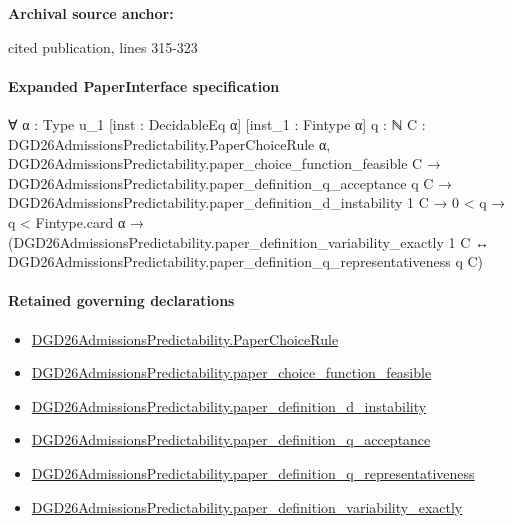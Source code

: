 \documentclass[10pt]{article}
\begin{document}
\textbf{Archival source anchor:} {\footnotesize\raggedright cited publication, lines 315-\allowbreak{}323\par}
\paragraph{Expanded PaperInterface specification}
\begin{ReviewVerbatim}
∀ {α : Type u_1} [inst : DecidableEq α] [inst_1 : Fintype α] {q : ℕ}
  {C : DGD26AdmissionsPredictability.PaperChoiceRule α},
  DGD26AdmissionsPredictability.paper_choice_function_feasible C →
    DGD26AdmissionsPredictability.paper_definition_q_acceptance q C →
      DGD26AdmissionsPredictability.paper_definition_d_instability 1 C →
        0 < q →
          q < Fintype.card α →
            (DGD26AdmissionsPredictability.paper_definition_variability_exactly 1 C ↔
              DGD26AdmissionsPredictability.paper_definition_q_representativeness q C)
\end{ReviewVerbatim}

\paragraph{Retained governing declarations}
\begin{itemize}\raggedright
\item \hyperlink{governing-declaration-4678951b4432b184}{DGD26\allowbreak{}Admissions\allowbreak{}Predictability.\allowbreak{}Paper\allowbreak{}Choice\allowbreak{}Rule}
\item \hyperlink{governing-declaration-f7de74a44053f6d5}{DGD26\allowbreak{}Admissions\allowbreak{}Predictability.\allowbreak{}paper\_\allowbreak{}choice\_\allowbreak{}function\_\allowbreak{}feasible}
\item \hyperlink{governing-declaration-ce2c1c7a5233a84a}{DGD26\allowbreak{}Admissions\allowbreak{}Predictability.\allowbreak{}paper\_\allowbreak{}definition\_\allowbreak{}d\_\allowbreak{}instability}
\item \hyperlink{governing-declaration-7ecd62274fb2f391}{DGD26\allowbreak{}Admissions\allowbreak{}Predictability.\allowbreak{}paper\_\allowbreak{}definition\_\allowbreak{}q\_\allowbreak{}acceptance}
\item \hyperlink{governing-declaration-1099c3b9d08feae8}{DGD26\allowbreak{}Admissions\allowbreak{}Predictability.\allowbreak{}paper\_\allowbreak{}definition\_\allowbreak{}q\_\allowbreak{}representativeness}
\item \hyperlink{governing-declaration-ce6697be3f1c2256}{DGD26\allowbreak{}Admissions\allowbreak{}Predictability.\allowbreak{}paper\_\allowbreak{}definition\_\allowbreak{}variability\_\allowbreak{}exactly}
\end{itemize}
\end{document}
